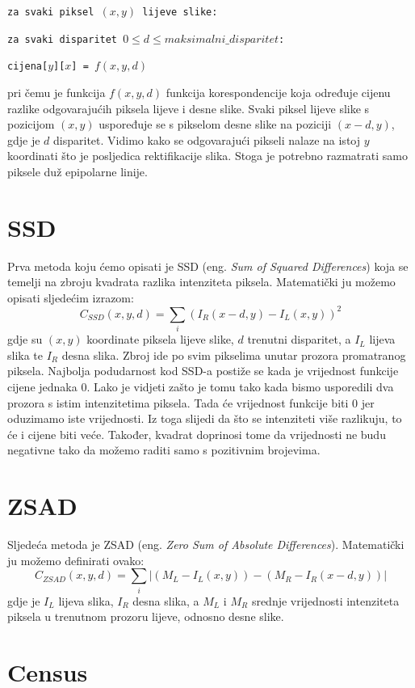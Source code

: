 \documentclass[utf8, zavrsni, numeric]{fer}
\begin{document}
{\tt za svaki piksel $(x, y)$ lijeve slike:}

{\quad \tt za svaki disparitet $0 \leq d \leq maksimalni\_ disparitet$:}

{\quad\quad \tt cijena[$y$][$x$] = $f(x, y, d)$}    


\noindent pri čemu je funkcija $f(x, y, d)$ funkcija korespondencije koja određuje cijenu razlike odgovarajućih piksela lijeve i desne slike. Svaki piksel lijeve slike s pozicijom $(x, y)$
uspoređuje se s pikselom desne slike na poziciji $(x - d, y)$, gdje je $d$ disparitet. Vidimo kako se odgovarajući pikseli nalaze na istoj $y$ koordinati što je posljedica rektifikacije slika.
Stoga je potrebno razmatrati samo piksele duž epipolarne linije.

\section{SSD}

Prva metoda koju ćemo opisati je SSD ({eng. \sl Sum of Squared Differences}) koja se temelji na zbroju kvadrata razlika intenziteta piksela.
Matematički ju možemo opisati sljedećim izrazom:
$$C_{SSD}(x, y, d) = \sum_{i}(I_R(x - d, y) - I_L(x, y))^2 $$
gdje su $(x, y)$ koordinate piksela lijeve slike, $d$ trenutni disparitet, a $I_L$ lijeva slika te $I_R$ desna slika. Zbroj ide po svim pikselima unutar prozora promatranog piksela.
Najbolja podudarnost kod SSD-a postiže se kada je vrijednost funkcije cijene jednaka $0$. Lako je vidjeti zašto je tomu tako kada bismo usporedili dva prozora s istim intenzitetima piksela. Tada će vrijednost funkcije biti $0$ jer oduzimamo iste vrijednosti. Iz toga slijedi da što se intenziteti više razlikuju, to će i cijene biti veće. Također, kvadrat doprinosi tome da vrijednosti ne budu negativne tako da možemo raditi samo s pozitivnim brojevima.

\section{ZSAD}

Sljedeća metoda je ZSAD ({eng. \sl Zero Sum of Absolute Differences}). Matematički ju možemo definirati ovako:
$$C_{ZSAD}(x, y, d) = \sum_{i}\lvert(M_L - I_L(x, y)) - (M_R - I_R(x - d, y))\rvert$$
gdje je $I_L$ lijeva slika, $I_R$ desna slika, a $M_L$ i $M_R$ srednje vrijednosti intenziteta piksela u trenutnom prozoru lijeve, odnosno desne slike.
\section{Census}
\end{document}
